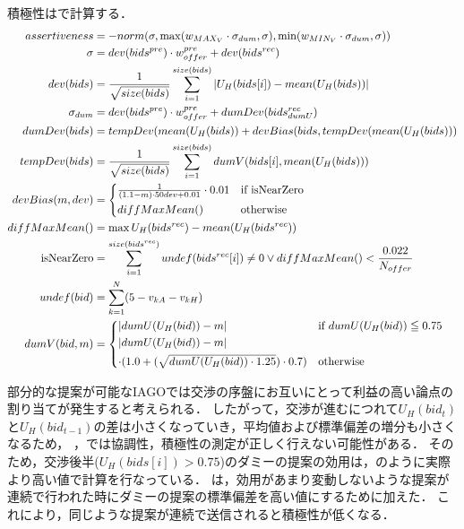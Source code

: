 積極性はで計算する．
\begin{align}
    assertiveness &= -norm(\sigma, \max (w_{MAX_V} \cdot \sigma_{dum}, \sigma), \min (w_{MIN_V} \cdot \sigma_{dum}, \sigma)) \label{eq:assertiveness} \\
    \sigma &= dev(bids^{pre}) \cdot w_{offer}^{pre} + dev(bids^{rec}) \nonumber \\
    dev(bids) &= \frac{1}{\sqrt{size(bids)}}\sum_{i = 1}^{size(bids)} |U_H(bids[i]) - mean(U_H(bids))| \nonumber \\
    \sigma_{dum} &= dev(bids^{pre}) \cdot w_{offer}^{pre} + dumDev(bids_{dumU}^{rec}) \nonumber \\
    dumDev(bids) &= tempDev(mean(U_H(bids)) + devBias(bids, tempDev(mean(U_H(bids))) \nonumber \\
    tempDev(bids) &= \frac{1}{\sqrt{size(bids)}}\sum_{i = 1}^{size(bids)} dumV(bids[i], mean(U_H(bids))) \nonumber \\
    devBias(m, dev) &= 
    \begin{cases*}
        \frac{1}{(1.1 - m) \cdot 50dev + 0.01} \cdot 0.01 & if isNearZero \\
        diffMaxMean() & otherwise 
    \end{cases*} \label{eq:devBias} \\
    diffMaxMean() &= \max U_H(bids^{rec}) - mean(U_H(bids^{rec})) \nonumber \\
    {\rm isNearZero} &= \sum_{i = 1}^{size(bids^{rec})}undef(bids^{rec}[i]) \neq 0 \vee diffMaxMean() < \frac{0.022}{N_{offer}} \nonumber \\
    undef(bid) &= \sum_{k = 1}^{N} (5 - v_{kA} - v_{kH}) \nonumber \\
    dumV(bid, m) &=
    \begin{cases*}
        |dumU(U_H(bid)) - m| & if $dumU(U_H(bid)) \leqq 0.75$ \\
        |dumU(U_H(bid)) - m| \\
        \cdot (1.0 + (\sqrt{dumU(U_H(bid)) \cdot 1.25}) \cdot 0.7) & otherwise 
    \end{cases*} \label{eq:dummyV}
\end{align}

部分的な提案が可能なIAGOでは交渉の序盤にお互いにとって利益の高い論点の割り当てが発生すると考えられる．
したがって，交渉が進むにつれて$U_H(bid_t)$と$U_H(bid_{t-1})$の差は小さくなっていき，平均値および標準偏差の増分も小さくなるため，
，では協調性，積極性の測定が正しく行えない可能性がある．
そのため，交渉後半($U_H(bids[i]) > 0.75$)のダミーの提案の効用は，のように実際より高い値で計算を行なっている．
は，効用があまり変動しないような提案が連続で行われた時にダミーの提案の標準偏差を高い値にするために加えた．
これにより，同じような提案が連続で送信されると積極性が低くなる．

